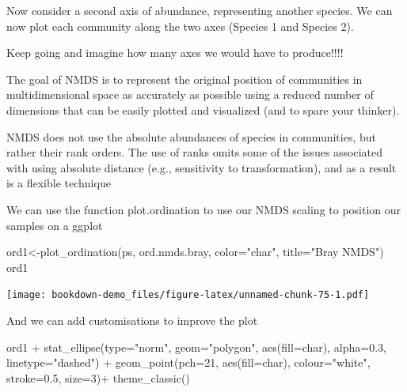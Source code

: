 \documentclass[
]{book}
\newenvironment{Shaded}{\begin{snugshade}}{\end{snugshade}}
\newcommand{\AttributeTok}[1]{\textcolor[rgb]{0.77,0.63,0.00}{#1}}
\newcommand{\DecValTok}[1]{\textcolor[rgb]{0.00,0.00,0.81}{#1}}
\newcommand{\FloatTok}[1]{\textcolor[rgb]{0.00,0.00,0.81}{#1}}
\newcommand{\FunctionTok}[1]{\textcolor[rgb]{0.00,0.00,0.00}{#1}}
\newcommand{\NormalTok}[1]{#1}
\newcommand{\OtherTok}[1]{\textcolor[rgb]{0.56,0.35,0.01}{#1}}
\newcommand{\SpecialCharTok}[1]{\textcolor[rgb]{0.00,0.00,0.00}{#1}}
\newcommand{\StringTok}[1]{\textcolor[rgb]{0.31,0.60,0.02}{#1}}
\begin{document}
Now consider a second axis of abundance, representing another species. We can now plot each community along the two axes (Species 1 and Species 2).

Keep going and imagine how many axes we would have to produce!!!!

The goal of NMDS is to represent the original position of communities in multidimensional space as accurately as possible using a reduced number of dimensions that can be easily plotted and visualized (and to spare your thinker).

NMDS does not use the absolute abundances of species in communities, but rather their rank orders. The use of ranks omits some of the issues associated with using absolute distance (e.g., sensitivity to transformation), and as a result is a flexible technique

We can use the function plot.ordination to use our NMDS scaling to position our samples on a ggplot

\begin{Shaded}
\begin{Highlighting}[]
\NormalTok{ord1}\OtherTok{\textless{}{-}}\FunctionTok{plot\_ordination}\NormalTok{(ps, ord.nmds.bray, }\AttributeTok{color=}\StringTok{"char"}\NormalTok{, }\AttributeTok{title=}\StringTok{"Bray NMDS"}\NormalTok{)}
\NormalTok{ord1}
\end{Highlighting}
\end{Shaded}

\texttt{[image: bookdown-demo\_files/figure-latex/unnamed-chunk-75-1.pdf]}

And we can add customisations to improve the plot

\begin{Shaded}
\begin{Highlighting}[]
\NormalTok{ord1 }\SpecialCharTok{+} \FunctionTok{stat\_ellipse}\NormalTok{(}\AttributeTok{type=}\StringTok{"norm"}\NormalTok{,}
                    \AttributeTok{geom=}\StringTok{"polygon"}\NormalTok{,}
                    \FunctionTok{aes}\NormalTok{(}\AttributeTok{fill=}\NormalTok{char),}
                    \AttributeTok{alpha=}\FloatTok{0.3}\NormalTok{,}
                    \AttributeTok{linetype=}\StringTok{"dashed"}\NormalTok{) }\SpecialCharTok{+}
     \FunctionTok{geom\_point}\NormalTok{(}\AttributeTok{pch=}\DecValTok{21}\NormalTok{, }\FunctionTok{aes}\NormalTok{(}\AttributeTok{fill=}\NormalTok{char), }\AttributeTok{colour=}\StringTok{"white"}\NormalTok{, }\AttributeTok{stroke=}\FloatTok{0.5}\NormalTok{, }\AttributeTok{size=}\DecValTok{3}\NormalTok{)}\SpecialCharTok{+}
        \FunctionTok{theme\_classic}\NormalTok{()}
\end{Highlighting}
\end{Shaded}
\end{document}
